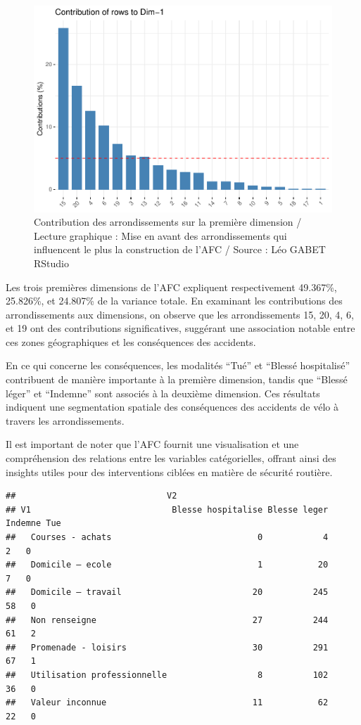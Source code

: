 \documentclass[french,]{compterendu}
\theoremstyle{urcastyle}
\theoremstyle{remark}
\begin{document}
\begin{figure}[H]

{\centering \includegraphics[width=0.9\linewidth]{Rapport_ADD_LEO-GABET_files/figure-latex/afcARR-1} 

}

\caption{Contribution des arrondissements sur la première dimension / Lecture graphique : Mise en avant des arrondissements qui influencent le plus la construction de l'AFC / Source : Léo GABET RStudio}\label{fig:afcARR}
\end{figure}

Les trois premières dimensions de l'AFC expliquent respectivement 49.367\%, 25.826\%, et 24.807\% de la variance totale. En examinant les contributions des arrondissements aux dimensions, on observe que les arrondissements 15, 20, 4, 6, et 19 ont des contributions significatives, suggérant une association notable entre ces zones géographiques et les conséquences des accidents.

En ce qui concerne les conséquences, les modalités ``Tué'' et ``Blessé hospitalisé'' contribuent de manière importante à la première dimension, tandis que ``Blessé léger'' et ``Indemne'' sont associés à la deuxième dimension. Ces résultats indiquent une segmentation spatiale des conséquences des accidents de vélo à travers les arrondissements.

Il est important de noter que l'AFC fournit une visualisation et une compréhension des relations entre les variables catégorielles, offrant ainsi des insights utiles pour des interventions ciblées en matière de sécurité routière.

\begin{verbatim}
##                              V2
## V1                            Blesse hospitalise Blesse leger Indemne Tue
##   Courses - achats                             0            4       2   0
##   Domicile – ecole                             1           20       7   0
##   Domicile – travail                          20          245      58   0
##   Non renseigne                               27          244      61   2
##   Promenade - loisirs                         30          291      67   1
##   Utilisation professionnelle                  8          102      36   0
##   Valeur inconnue                             11           62      22   0
\end{verbatim}
\end{document}

